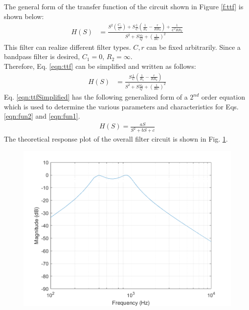 \documentclass[hidelinks]{article}
\begin{document}
	\noindent The general form of the transfer function of the circuit shown in Figure \ref{f:ttf} is shown below:
	\begin{align}
		\label{eqn:ttf}
		H(S) &= \frac{S^{2} \left(\frac{C_1}{C}\right) + S \frac{1}{C}\left(\frac{1}{R_1} - \frac{r}{R R_3}\right) + \frac{1}{C^{2} R R_2}}
		{S^{2} + S \frac{\omega_o}{Q} + \left(\frac{1}{RC}\right)^{2}}
	\end{align}
	This filter can realize different filter types. $C, r$ can be fixed arbitrarily. Since a bandpass filter is desired, $C_1 = 0$, $R_2 = \infty$.\\
	Therefore, Eq. \ref{eqn:ttf} can be simplified and written as follows:
	\begin{align}
		\label{eqn:ttfSimplified}
		H(S) &= \frac{S \frac{1}{C}\left(\frac{1}{R_1} - \frac{r}{R R_3}\right)}
		{S^{2} + S \frac{\omega_o}{Q} + \left(\frac{1}{RC}\right)^{2}}
	\end{align} 
	Eq. \ref{eqn:ttfSimplified} has the following generalized form of a $2^{nd}$ order equation which is used to determine the various parameters and characteristics for Eqs. \ref{eqn:fun2} and \ref{eqn:fun1}.
	\begin{align}
		\label{eqn:param}
		H(S) = \frac{a S}{S^{2} + b S+ c}
	\end{align}
	The theoretical response plot of the overall filter circuit is shown in Fig. \ref{f:overallResponse}.
	\begin{figure}[htbp]
		\centering
		\includegraphics[width=0.6\textheight]{overall_gain.png}
		\label{f:overallResponse}
	\end{figure}
\end{document}
